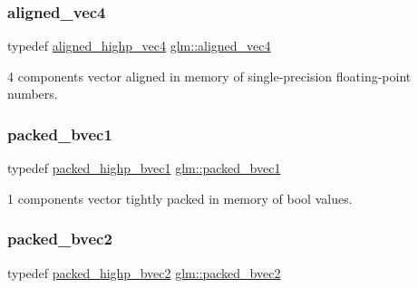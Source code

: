 \subsubsection{\texorpdfstring{aligned\+\_\+vec4}{aligned\_vec4}}
{\footnotesize\ttfamily typedef \hyperlink{group__gtc__type__aligned_ga60d6561b0daa150c617f3a7a277e44ee}{aligned\+\_\+highp\+\_\+vec4} \hyperlink{group__gtc__type__aligned_gad26d520694d7b865507819c2d9f2b196}{glm\+::aligned\+\_\+vec4}}



4 components vector aligned in memory of single-\/precision floating-\/point numbers. 

\mbox{\label{group__gtc__type__aligned_ga9afdf9c24a30d7c6c46fa29011908ac5}} 
\subsubsection{\texorpdfstring{packed\+\_\+bvec1}{packed\_bvec1}}
{\footnotesize\ttfamily typedef \hyperlink{group__gtc__type__aligned_ga00ef8acfca23dca78e1baa65bb5861ac}{packed\+\_\+highp\+\_\+bvec1} \hyperlink{group__gtc__type__aligned_ga9afdf9c24a30d7c6c46fa29011908ac5}{glm\+::packed\+\_\+bvec1}}



1 components vector tightly packed in memory of bool values. 

\mbox{\label{group__gtc__type__aligned_gabbb5ab4c9a0de67e04e2f183c0bff576}} 
\subsubsection{\texorpdfstring{packed\+\_\+bvec2}{packed\_bvec2}}
{\footnotesize\ttfamily typedef \hyperlink{group__gtc__type__aligned_ga8059c50785881a9f30b9a8e3ff5daf83}{packed\+\_\+highp\+\_\+bvec2} \hyperlink{group__gtc__type__aligned_gabbb5ab4c9a0de67e04e2f183c0bff576}{glm\+::packed\+\_\+bvec2}}



